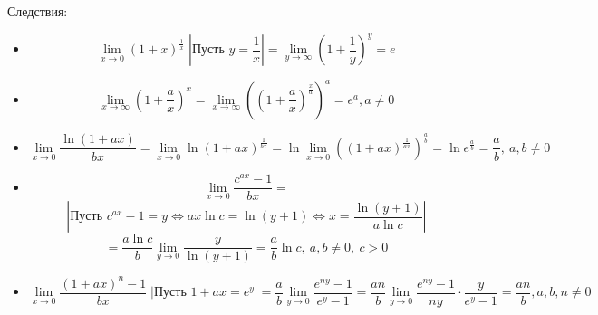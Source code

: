 Следствия:
\begin{itemize}
	\item \begin{equation*}
	\lim_{x \to 0} (1 + x)^{\tfrac1x} \;
	\left| \text{Пусть } y = \frac1x \right| =
	\lim_{y \to \infty} \left( 1 + \frac1y \right)^y = e
	\end{equation*}
	
	\item \begin{equation*}
	\lim_{x \to \infty} \left( 1 + \frac{a}x \right)^x =
	\lim_{x \to \infty} \left( \left( 1 + \frac{a}x \right)^{\tfrac{x}a} \right)^a =
	e^a, a \neq 0
	\end{equation*}
	
	\item \begin{equation*}
	\lim_{x \to 0} \frac{\ln (1 + ax)}{bx} =
	\lim_{x \to 0} \ln (1 + ax)^{\tfrac1{bx}} =
	\ln \lim_{x \to 0} \left( (1 + ax)^{\tfrac1{ax}} \right)^{\tfrac{a}b} =
	\ln e^{\tfrac{a}b} =
	\frac{a}b, \ a, b \neq 0
	\end{equation*}
	
	\item \begin{equation*}
	\lim_{x \to 0} \frac{c^{ax} - 1}{bx} =
	\end{equation*}
	\begin{equation*}
	\left| \text{Пусть } c^{ax} - 1 = y \Leftrightarrow ax\ln c = \ln (y + 1) \Leftrightarrow x = \frac{\ln (y + 1)}{a\ln c} \right|
	\end{equation*}
	\begin{equation*}
	= \frac{a\ln c}b \lim_{y \to 0} \frac{y}{\ln (y + 1)} =
	\frac{a}b \ln c, \ a, b \neq 0, \ c > 0
	\end{equation*}
	
	\item \begin{equation*}
	\lim_{x \to 0} \frac{(1 + ax)^n - 1}{bx} \;
	\left| \text{Пусть } 1 + ax = e^y \right| =
	\frac{a}b \lim_{y \to 0} \frac{e^{ny} - 1}{e^y - 1} =
	\frac{an}b \lim_{y \to 0} \frac{e^{ny} - 1}{ny} \cdot \frac{y}{e^y - 1} =
	\frac{an}b, a, b, n \neq 0
	\end{equation*}
\end{itemize}